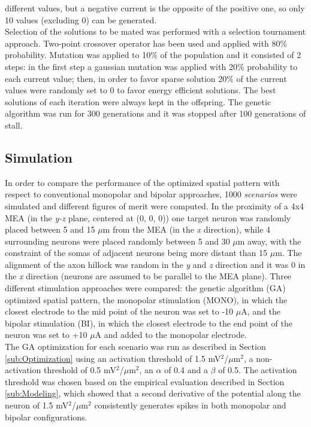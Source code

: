 \documentclass[conference]{IEEEtran}
\begin{document}
different values, but a negative current is the opposite of the positive
one, so only 10 values (excluding 0) can be generated.\\
Selection of the solutions to be mated was performed with a selection
tournament approach. Two-point crossover operator has been used and
applied with 80\% probability. Mutation was applied to 10\% of the
population and it consisted of 2 steps: in the first step a gaussian
mutation was applied with 20\% probability to each current value;
then, in order to favor sparse solution 20\% of the current values
were randomly set to 0 to favor energy efficient solutions. The best
solutions of each iteration were always kept in the offspring. The
genetic algorithm was run for 300 generations and it was stopped after
100 generations of stall.


\subsection{Simulation}

In order to compare the performance of the optimized spatial pattern
with respect to conventional monopolar and bipolar approaches, 1000
\emph{scenarios} were simulated and different figures of merit were
computed. In the proximity of a 4x4 MEA (in the \emph{y-z} plane,
centered at (0, 0, 0)) one target neuron was randomly placed between
5 and 15 $\mu$m from the MEA (in the \emph{x} direction),
while 4 surrounding neurons were placed randomly between 5 and 30 $\mu$m away,
with the constraint of the somas of adjacent neurons being more distant
than 15 $\mu$m. The alignment of the axon hillock was random
in the \emph{y} and \emph{z }direction and it was 0 in the \emph{x
}direction (neurons are assumed to be parallel to the MEA plane).
Three different stimulation approaches were compared: the genetic
algorithm (GA) optimized spatial pattern, the monopolar stimulation
(MONO), in which the closest electrode to the mid point of the neuron
was set to -10 $\mu$A, and the bipolar stimulation (BI), in
which the closest electrode to the end point of the neuron was set
to +10 $\mu$A and added to the monopolar electrode.\\
The GA optimization for each scenario was run as described in Section
\ref{sub:Optimization} using an activation threshold of 1.5 mV$^{2}$/$\mu$m$^{2}$,
a non-activation threshold of 0.5 mV$^{2}$/$\mu$m$^{2}$,
an $\alpha$ of 0.4 and a $\beta$ of 0.5. The activation threshold
was chosen based on the empirical evaluation described in Section
\ref{sub:Modeling}, which showed that a second derivative of the
potential along the neuron of 1.5 mV$^{2}$/$\mu$m$^{2}$
consistently generates spikes in both monopolar and bipolar configurations.
\end{document}
